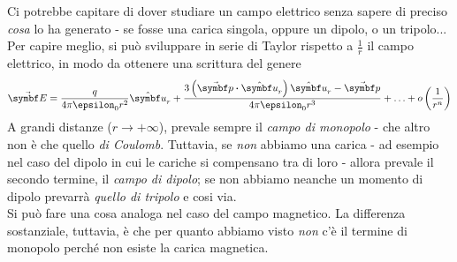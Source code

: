 		\begin{observe}
			Ci potrebbe capitare di dover studiare un campo elettrico senza sapere di preciso \textit{cosa} lo ha generato - se fosse una carica singola, oppure un dipolo, o un tripolo... Per capire meglio, si può sviluppare in serie di Taylor rispetto a $\frac{1}{r}$ il campo elettrico, in modo da ottenere una scrittura del genere
			\begin{equation*}
				\vba{E}=\frac{q}{4\pi \epsilon_0 r^2}\vbh{u}_r+\frac{3\left(\vba{p}\vdot \vbh{u}_r\right)\vbh{u}_r-\vba{p}}{4\pi\epsilon_0r^3}+\ldots+o\left(\frac{1}{r^n}\right)
			\end{equation*}%
			A grandi distanze ($r\to+\infty$), prevale sempre il \textit{campo di monopolo} - che altro non è che quello \textit{di Coulomb}. Tuttavia, se \textit{non} abbiamo una carica - ad esempio nel caso del dipolo in cui le cariche si compensano tra di loro - allora prevale il secondo termine, il \textit{campo di dipolo}; se non abbiamo neanche un momento di dipolo prevarrà \textit{quello di tripolo} e cosi via.\\
			Si può fare una cosa analoga nel caso del campo magnetico. La differenza sostanziale, tuttavia, è che per quanto abbiamo visto \textit{non} c'è il termine di monopolo perché non esiste la carica magnetica.
		\end{observe}
